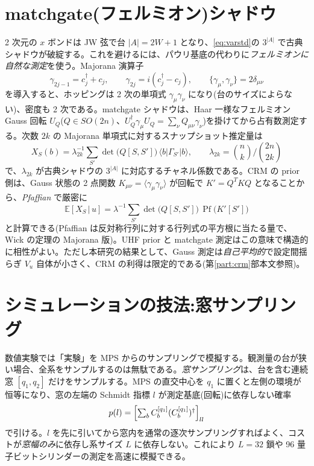 \documentclass[11pt,a4paper]{ltjsarticle}
\newcommand{\bra}[1]{\langle #1|}
\newcommand{\ket}[1]{|#1\rangle}
\newcommand{\ev}[1]{\langle #1\rangle}
\newcommand{\Pf}{\operatorname{Pf}}
\newcommand{\cd}{c^\dagger}
\begin{document}
\section{matchgate(フェルミオン)シャドウ}
\label{sec:matchgate-t}

2 次元の $x$ ボンドは JW 弦で台 $|A|=2W+1$ となり、\eqref{eq:varstd}の $3^{|A|}$ で古典シャドウが破綻する。これを避けるには、パウリ基底の代わりに\emph{フェルミオンに自然な測定}を使う。Majorana 演算子
\begin{equation}
  \gamma_{2j-1}=\cd_j+c_j,\qquad \gamma_{2j}=i(\cd_j-c_j),\qquad \{\gamma_\mu,\gamma_\nu\}=2\delta_{\mu\nu}
\end{equation}
を導入すると、ホッピングは 2 次の単項式 $\gamma_\mu\gamma_\nu$ になり(台のサイズによらない)、密度も 2 次である。matchgate シャドウは、Haar 一様なフェルミオン Gauss 回転 $U_Q$($Q\in SO(2n)$、$U_Q^\dagger\gamma_\mu U_Q=\sum_\nu Q_{\mu\nu}\gamma_\nu$)を掛けてから占有数測定する。次数 $2k$ の Majorana 単項式に対するスナップショット推定量は
\begin{equation}
  X_S(b)=\lambda_{2k}^{-1}\sum_{S'}\det\bigl(Q[S,S']\bigr)\,\bra{b}\Gamma_{S'}\ket{b},\qquad
  \lambda_{2k}=\binom{n}{k}\Big/\binom{2n}{2k}
\end{equation}
で、$\lambda_{2k}$ が古典シャドウの $3^{|A|}$ に対応するチャネル係数である。CRM の prior 側は、Gauss 状態の 2 点関数 $K_{\mu\nu}=\ev{\gamma_\mu\gamma_\nu}$ が回転で $K'=Q^TKQ$ となることから、\emph{Pfaffian} で厳密に
\begin{equation}
  \mathbb E[X_S\,|\,u]=\lambda^{-1}\sum_{S'}\det\bigl(Q[S,S']\bigr)\,\Pf\bigl(K'[S']\bigr)
\end{equation}
と計算できる(Pfaffian は反対称行列に対する行列式の平方根に当たる量で、Wick の定理の Majorana 版)。UHF prior と matchgate 測定はこの意味で構造的に相性がよい。ただし本研究の結果として、Gauss 測定は\emph{自己平均的}で設定間揺らぎ $V_u$ 自体が小さく、CRM の利得は限定的である(第\ref{part:crm}部本文参照)。

\section{シミュレーションの技法:窓サンプリング}
\label{sec:window}

数値実験では「実験」を MPS からのサンプリングで模擬する。観測量の台が狭い場合、全系をサンプルするのは無駄である。\emph{窓サンプリング}は、台を含む連続窓 $[q_1,q_2]$ だけをサンプルする。MPS の直交中心を $q_1$ に置くと左側の環境が恒等になり、窓の左端の Schmidt 指標 $l$ が測定基底(回転)に依存しない確率
\begin{equation}
  p(l)=\Bigl[\textstyle\sum_b C^{[q_1]}_b (C^{[q_1]}_b)^\dagger\Bigr]_{ll}
\end{equation}
で引ける。$l$ を先に引いてから窓内を通常の逐次サンプリングすればよく、コストが\emph{窓幅のみ}に依存し系サイズ $L$ に依存しない。これにより $L=32$ 鎖や 96 量子ビットシリンダーの測定を高速に模擬できる。
\end{document}
